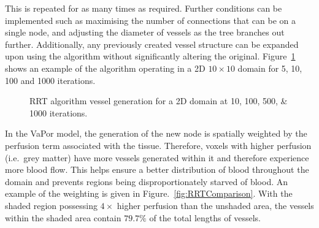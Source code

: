 \documentclass[11pt,english,a4paper,twoside,openright]{report}
\begin{document}
{{{{{{{{This is repeated for as many times as required. Further conditions can be implemented such as maximising the number of connections that can be on a single node, and adjusting the diameter of vessels as the tree branches out further. Additionally, any previously created vessel structure can be expanded upon using the algorithm without significantly altering the original. Figure~\ref{fig:RRT2D} shows an example of the algorithm operating in a 2D $10\times10$ domain for 5, 10, 100 and 1000 iterations.

\begin{figure}[h]
	\centering
	\caption[RRT algorithm vessel generation for a 2D domain]{RRT algorithm vessel generation for a 2D domain at 10, 100, 500, \& 1000 iterations.}
	\label{fig:RRT2D}
\end{figure}

In the VaPor model, the generation of the new node is spatially weighted by the perfusion term associated with the tissue. Therefore, voxels with higher perfusion (i.e.\ grey matter) have more vessels generated within it and therefore experience more blood flow. This helps ensure a better distribution of blood throughout the domain and prevents regions being disproportionately starved of blood. An example of the weighting is given in Figure.~\ref{fig:RRTComparison}. With the shaded region possessing $4\times$ higher perfusion than the unshaded area, the vessels within the shaded area contain $79.7\%$ of the total lengths of vessels.

}}}}}}}}
\end{document}
